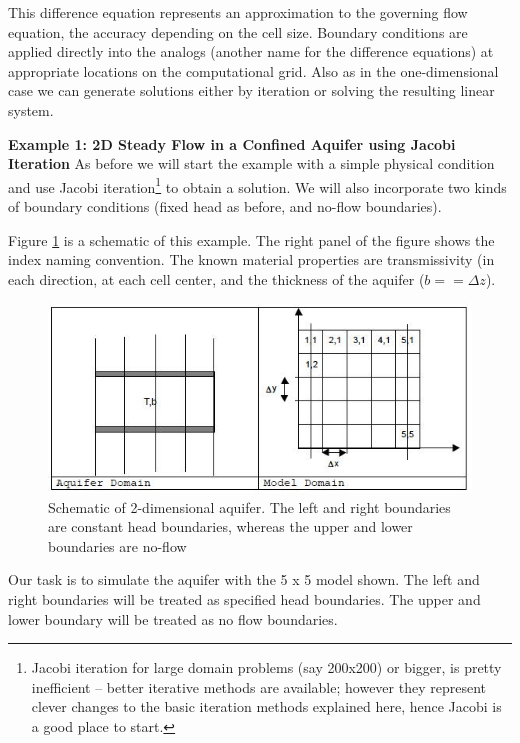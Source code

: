 This difference equation represents an approximation to the governing flow equation, the accuracy depending on the cell
size. Boundary conditions are applied directly into the analogs (another name for the difference equations) at appropriate
locations on the computational grid. Also as in the one-dimensional case we can generate solutions either by iteration or solving the resulting linear system.  

\textbf{Example 1: 2D Steady Flow in a Confined Aquifer using Jacobi Iteration}
As before we will start the example with a simple physical condition and use Jacobi iteration\footnote{Jacobi iteration for large domain problems (say 200x200) or bigger, is pretty inefficient -- better iterative methods are available; however they represent clever changes to the basic iteration methods explained here, hence Jacobi is a good place to start.} to obtain a solution.  
We will also incorporate two kinds of boundary conditions (fixed head as before, and no-flow boundaries).

Figure \ref{fig:aquifer-2d-layout} is a schematic of this example.   The right panel of the figure shows the index naming convention.  The known material properties are transmissivity (in each direction, at each cell center, and the thickness of the aquifer ($b == \Delta z$).
\begin{figure}[h!] %
   \centering
   \includegraphics[width=6in]{./17-SteadyGroundwaterFlow/aquifer-2d-layout.jpg} 
   \caption{Schematic of 2-dimensional aquifer.  The left and right boundaries are constant head boundaries, whereas the upper and lower boundaries are no-flow}
   \label{fig:aquifer-2d-layout}
\end{figure}
Our task is to simulate the aquifer with the 5 x 5 model shown. 
The left and right boundaries will be treated as specified head boundaries. 
The upper and lower boundary will be treated as no flow boundaries.

